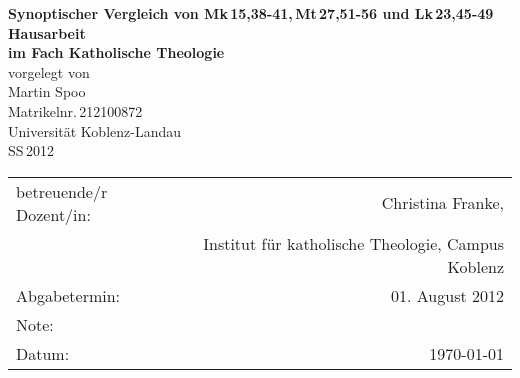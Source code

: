 \begin{titlepage}
	\begin{center}
		\quad
		\vfill
		\Huge{
			 \textbf{Synoptischer Vergleich von Mk\,15,38-41,\,Mt\,27,51-56 und Lk\,23,45-49}
		}
		\vspace{5mm}
		\vfill
		\large{
			{\bf Hausarbeit\\
			im Fach Katholische Theologie}
		}
		\\
		\vspace{0.5cm}
		\large{
			{vorgelegt von\\
			Martin Spoo\\
			Matrikelnr.\,212100872}
		}
		\vspace{1cm}
		\\
		\Large{
			{Universität Koblenz-Landau}\\
			{SS\,2012}
		}
		\vspace{1cm}
		\begin{table}[b]
			\begin{center}
				\begin{tabular}{lr}
					betreuende/r Dozent/in: & Christina Franke, \\
								&	Institut für katholische Theologie, Campus Koblenz \\
					\vspace{0.5cm}
					Abgabetermin: & 01. August 2012 \\
					Note: & \\
					Datum: & \today
				\end{tabular}
			\end{center}
		\end{table}
	\end{center}
\end{titlepage}
\renewcommand{\baselinestretch}{1.1}
\restoregeometry

